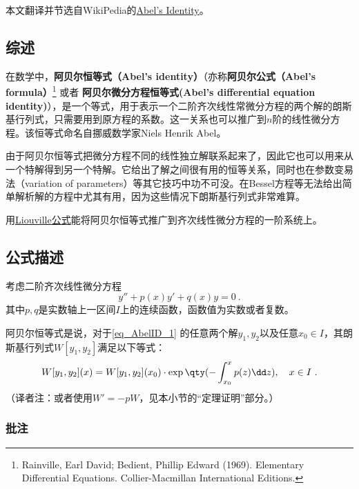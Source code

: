 
本文翻译并节选自WikiPedia的\href{https://en.wikipedia.org/wiki/Abel\%27s_identity}{Abel's Identity}。


\subsection{综述}

在数学中，\textbf{阿贝尔恒等式（Abel's identity）}（亦称\textbf{阿贝尔公式（Abel's formula）}\footnote{Rainville, Earl David; Bedient, Phillip Edward (1969). Elementary Differential Equations. Collier-Macmillan International Editions.} 或者 \textbf{阿贝尔微分方程恒等式(Abel's differential equation identity)}），是一个等式，用于表示一个二阶齐次线性常微分方程的两个解的朗斯基行列式，只需要用到原方程的系数。这一关系也可以推广到$n$阶的线性微分方程。该恒等式命名自挪威数学家Niels Henrik Abel。

由于阿贝尔恒等式把微分方程不同的线性独立解联系起来了，因此它也可以用来从一个特解得到另一个特解。它给出了解之间很有用的恒等关系，同时也在参数变易法（variation of parameters）等其它技巧中功不可没。在Bessel方程等无法给出简单解析解的方程中尤其有用，因为这些情况下朗斯基行列式非常难算。

用\href{https://en.wikipedia.org/wiki/Liouville\%27s_formula}{Liouville公式}能将阿贝尔恒等式推广到齐次线性微分方程的一阶系统上。



\subsection{公式描述}

考虑二阶齐次线性微分方程
\begin{equation}\label{eq_AbelID_1}
y'' + p(x)y' +q(x)y = 0~.
\end{equation}
其中$p, q$是实数轴上一区间$I$上的连续函数，函数值为实数或者复数。

阿贝尔恒等式是说，对于\autoref{eq_AbelID_1} 的任意两个解$y_1, y_2$以及任意$x_0\in I$，其朗斯基行列式$W[y_1, y_2]$满足以下等式：
\begin{equation}\label{eq_AbelID_4}
W[y_1, y_2](x) = W[y_1, y_2](x_0)\cdot \exp\qty(-\int _{x_0}^x p(z)\dd z), \quad x\in I~.
\end{equation}
（译者注：或者使用$W'=-pW$，见本小节的“定理证明”部分。）


\subsubsection{批注}

